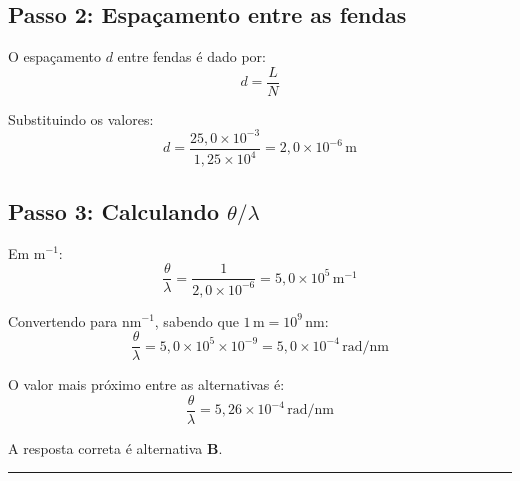 \documentclass[a4paper,12pt]{article}
\begin{document}
\begin{flushleft}
\subsection*{Passo 2: Espaçamento entre as fendas}

O espaçamento \(d\) entre fendas é dado por:
\[
d = \frac{L}{N}
\]

Substituindo os valores:
\[
d = \frac{25{,}0 \times 10^{-3}}{1{,}25 \times 10^4} = 2{,}0 \times 10^{-6}\,\mathrm{m}
\]

\subsection*{Passo 3: Calculando \( \theta/\lambda \)}

Em \(\mathrm{m}^{-1}\):
\[
\frac{\theta}{\lambda} = \frac{1}{2{,}0 \times 10^{-6}} = 5{,}0 \times 10^{5}\,\mathrm{m}^{-1}
\]

Convertendo para \(\mathrm{nm}^{-1}\), sabendo que \(1\,\mathrm{m} = 10^{9}\,\mathrm{nm}\):
\[
\frac{\theta}{\lambda} = 5{,}0 \times 10^{5} \times 10^{-9} = 5{,}0 \times 10^{-4}\,\mathrm{rad/nm}
\]

O valor mais próximo entre as alternativas é:
\[
\boxed{\frac{\theta}{\lambda} = 5{,}26 \times 10^{-4}\,\mathrm{rad/nm}}
\]


A resposta correta é alternativa \colorbox{green!50}{\textbf{B}}.
\end{flushleft}

\noindent\rule{\linewidth}{0.6pt}\\
\end{document}
